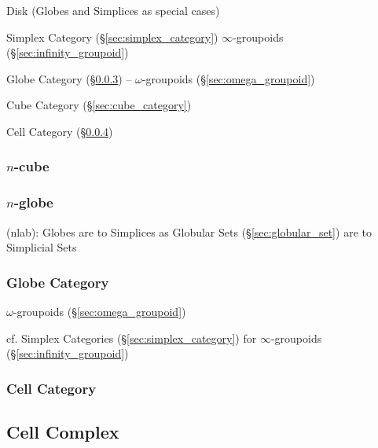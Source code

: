 Disk (Globes and Simplices as special cases)

\fist Simplex Category (\S\ref{sec:simplex_category})
$\infty$-groupoids (\S\ref{sec:infinity_groupoid})

\fist Globe Category (\S\ref{sec:globe_category}) --
$\omega$-groupoids (\S\ref{sec:omega_groupoid})

\fist Cube Category (\S\ref{sec:cube_category})

\fist Cell Category (\S\ref{sec:cell_category})



\subsubsection{$n$-cube}\label{sec:cellular_n_cube}

\subsubsection{$n$-globe}\label{sec:cellular_n_globe}

(nlab): Globes are to Simplices as Globular Sets (\S\ref{sec:globular_set}) are
to Simplicial Sets



\subsubsection{Globe Category}\label{sec:globe_category}


$\omega$-groupoids (\S\ref{sec:omega_groupoid})

\fist cf. Simplex Categories (\S\ref{sec:simplex_category}) for
$\infty$-groupoids (\S\ref{sec:infinity_groupoid})



\subsubsection{Cell Category}\label{sec:cell_category}



\subsection{Cell Complex}\label{sec:cell_complex}


